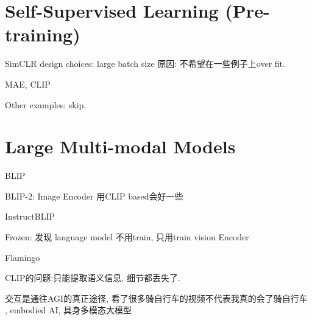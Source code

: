\section{Self-Supervised Learning (Pre-training)}

SimCLR design choices: large batch size 原因: 不希望在一些例子上over fit.

MAE, CLIP

Other examples: skip.

\section{Large Multi-modal Models}

BLIP

BLIP-2: Image Encoder 用CLIP based会好一些

InstructBLIP

Frozen: 发现 language model 不用train, 只用train vision Encoder

Flamingo

CLIP的问题:只能提取语义信息, 细节都丢失了.

交互是通往AGI的真正途径, 看了很多骑自行车的视频不代表我真的会了骑自行车
, embodied AI, 具身多模态大模型